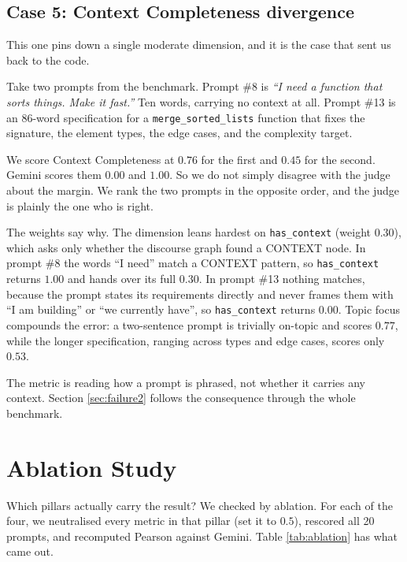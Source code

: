 \documentclass[conference]{IEEEtran}
\begin{document}
\subsection{Case 5: Context Completeness divergence}
This one pins down a single moderate dimension, and it is the case that sent us back to the code.

Take two prompts from the benchmark. Prompt \#8 is \emph{``I need a function that sorts things. Make it fast.''} Ten words, carrying no context at all. Prompt \#13 is an 86-word specification for a \texttt{merge\_sorted\_lists} function that fixes the signature, the element types, the edge cases, and the complexity target.

We score Context Completeness at $0.76$ for the first and $0.45$ for the second. Gemini scores them $0.00$ and $1.00$. So we do not simply disagree with the judge about the margin. We rank the two prompts in the opposite order, and the judge is plainly the one who is right.

The weights say why. The dimension leans hardest on \texttt{has\_context} (weight $0.30$), which asks only whether the discourse graph found a CONTEXT node. In prompt \#8 the words ``I need'' match a CONTEXT pattern, so \texttt{has\_context} returns $1.00$ and hands over its full $0.30$. In prompt \#13 nothing matches, because the prompt states its requirements directly and never frames them with ``I am building'' or ``we currently have'', so \texttt{has\_context} returns $0.00$. Topic focus compounds the error: a two-sentence prompt is trivially on-topic and scores $0.77$, while the longer specification, ranging across types and edge cases, scores only $0.53$.

The metric is reading how a prompt is phrased, not whether it carries any context. Section \ref{sec:failure2} follows the consequence through the whole benchmark.

\section{Ablation Study}

Which pillars actually carry the result? We checked by ablation. For each of the four, we neutralised every metric in that pillar (set it to $0.5$), rescored all 20 prompts, and recomputed Pearson against Gemini. Table \ref{tab:ablation} has what came out.
\end{document}
